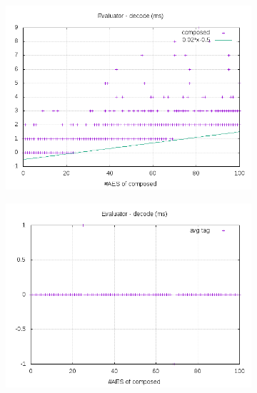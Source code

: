 \documentclass[10pt,a4paper]{article}
\begin{document}
\begin{figure}[h]
    \begin{subfigure}[t]{0.3\textwidth}
        \includegraphics[width=\textwidth]{eval_decode_plots}
        \caption{}
        \label{decode composed eval}
    \end{subfigure}
    \begin{subfigure}[t]{0.3\textwidth}
        \includegraphics[width=\textwidth]{eval_decode_avg}
        \caption{}
        \label{decode tag eval}
    \end{subfigure}
    \begin{subfigure}[t]{0.3\textwidth}

\end{subfigure}
\end{figure}
\end{document}
